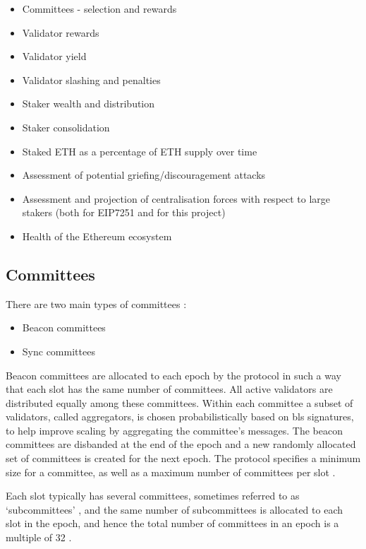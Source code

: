 \documentclass[UTF8]{article}
\begin{document}
\begin{itemize}
\item Committees - selection and rewards
\item Validator rewards
\item Validator yield
\item Validator slashing and penalties
\item Staker wealth and distribution
\item Staker consolidation
\item Staked ETH as a percentage of ETH supply over time
\item Assessment of potential griefing/discouragement attacks
\item Assessment and projection of centralisation forces with respect to large stakers (both for EIP7251 and for this project)
\item Health of the Ethereum ecosystem
\end{itemize}
\subsection{Committees}
\label{committee}
There are two main types of committees  \cite{Edgington2023}:

\begin{itemize}
\item Beacon committees
\item Sync committees
\end{itemize}

Beacon committees are allocated to each epoch by the protocol in such a way that each slot has the same number of committees. All active validators are distributed equally among these committees. Within each committee a subset of validators, called aggregators, is chosen probabilistically based on \gls{bls} signatures, to help improve scaling by aggregating the committee's messages. The beacon committees are disbanded at the end of the epoch and a new randomly allocated set of committees is created for the next epoch. The protocol specifies a minimum size for a committee, as well as a maximum number of committees per slot \cite{Edgington2023}.

Each slot typically has several committees, sometimes referred to as `subcommittees' \cite{Neuder2023b}, and the same number of subcommittees is allocated to each slot in the epoch, and hence the total number of committees in an epoch is a multiple of 32 \cite{Edgington2023}.
\end{document}
